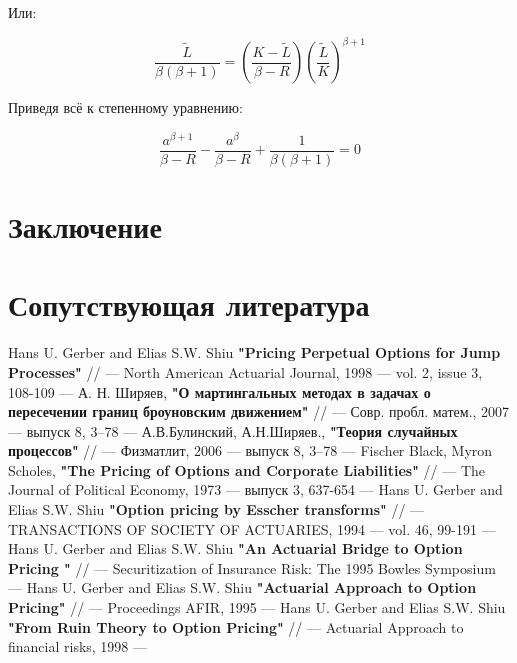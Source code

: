\documentclass[a4paper,12pt]{article}
\theoremstyle{definition}
\begin{document}
Или:

\begin{equation*}
    \frac{\tilde{L}}{\beta (\beta + 1)} = \left( \frac{K - \tilde{L}}{\beta - R} \right) \left( \frac{\tilde{L}}{K} \right)^{\beta + 1}
\end{equation*}

Приведя всё к степенному уравнению:

\begin{equation*}
    \frac{a^{\beta + 1}}{\beta - R} - \frac{a^{\beta}}{\beta - R} + \frac{1}{\beta (\beta + 1)} = 0
\end{equation*}

\section{Заключение}

\section{Сопутствующая литература}

\begin{thebibliography}{3}
Hans U. Gerber and Elias S.W. Shiu \textbf{"Pricing Perpetual Options for Jump Processes"} // --- North American Actuarial Journal, 1998 --- vol. 2, issue 3, 108-109 ---
А. Н. Ширяев, \textbf{"О мартингальных методах в задачах о пересечении границ броуновским движением"} // --- Совр. пробл. матем., 2007 --- выпуск 8, 3–78 ---
А.В.Булинский, А.Н.Ширяев., \textbf{"Теория случайных процессов"} // --- Физматлит, 2006 --- выпуск 8, 3–78 ---
Fischer Black, Myron Scholes, \textbf{"The Pricing of Options and Corporate Liabilities"} // --- The Journal of Political Economy, 1973 --- выпуск 3, 637-654 ---
Hans U. Gerber and Elias S.W. Shiu \textbf{"Option pricing by Esscher transforms"} // --- TRANSACTIONS OF SOCIETY OF ACTUARIES, 1994 --- vol. 46, 99-191 ---
Hans U. Gerber and Elias S.W. Shiu \textbf{"An Actuarial Bridge
to Option Pricing 
"} // --- Securitization of Insurance Risk: The 1995 Bowles Symposium ---
Hans U. Gerber and Elias S.W. Shiu \textbf{"Actuarial Approach to Option Pricing"} // --- Proceedings AFIR, 1995 ---
Hans U. Gerber and Elias S.W. Shiu \textbf{"From Ruin Theory to Option Pricing"} // --- Actuarial Approach to financial risks, 1998 ---
\end{thebibliography}
\end{document}
